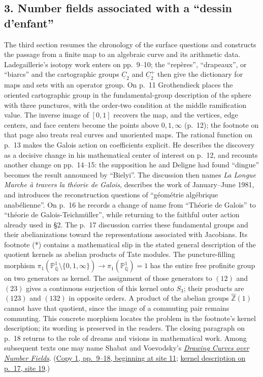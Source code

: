\subsection*{3. Number fields associated with a ``dessin d'enfant''}
The third section resumes the chronology of the surface questions and
constructs the passage from a finite map to an algebraic curve and its
arithmetic data. Ladegaillerie's isotopy work enters on pp.~9--10; the
``repères'', ``drapeaux'', or ``biarcs'' and the cartographic groups
$\underline C_2$ and $\underline C_2^+$ then give the dictionary for maps
and sets with an operator group. On p.~11 Grothendieck places the oriented
cartographic group in the fundamental-group description of the sphere
with three punctures, with the order-two condition at the middle
ramification value. The inverse image of $[0,1]$ recovers the map, and
the vertices, edge centers, and face centers become the points above
$0,1,\infty$ (p.~12); the footnote on that page also treats real curves
and unoriented maps. The rational function on p.~13 makes the Galois
action on coefficients explicit. He describes the discovery as a decisive
change in his mathematical center of interest on p.~12, and recounts
another change on pp.~14--15: the supposition he and Deligne had found
``dingue'' becomes the result announced by ``Bielyi''. The discussion then
names \emph{La Longue Marche à travers la théorie de Galois}, describes
the work of January--June 1981, and introduces the reconstruction questions
of ``géométrie algébrique anabélienne''. On p.~16 he records a change of
name from ``Théorie de Galois'' to ``théorie de Galois-Teichmüller'', while
returning to the faithful outer action already used in \S2. The p.~17
discussion carries these fundamental groups and their abelianizations
toward the representations associated with Jacobians. Its footnote (*)
contains a mathematical slip in the stated general description of the
quotient kernels as abelian products of Tate modules. The puncture-filling
morphism
$\pi_1(\mathbb P^1_{\overline{\mathbb Q}}\setminus\{0,1,\infty\})
\longrightarrow\pi_1(\mathbb P^1_{\overline{\mathbb Q}})=1$
has the entire free profinite group on two generators as kernel. The
assignment of those generators to $(12)$ and $(23)$ gives a continuous
surjection of this kernel onto $S_3$; their products are $(123)$ and
$(132)$ in opposite orders. A product of the abelian groups
$\hat{\mathbb Z}(1)$ cannot have that quotient, since the image of a
commuting pair remains commuting. This concrete morphism locates the
problem in the footnote's kernel description; its wording is preserved
in the readers. The closing paragraph on p.~18 returns to the role of
dreams and visions in mathematical work. Among subsequent texts one may
name Shabat and Voevodsky's
\href{https://www.math.ias.edu/vladimir/node/79}{\emph{Drawing Curves over Number Fields}}.
(\href{https://grothendieck.umontpellier.fr/web/viewer.html?file=../119.pdf\#page=12}{Copy 1, pp.~9--18, beginning at site 11};
\href{https://grothendieck.umontpellier.fr/web/viewer.html?file=../119.pdf\#page=20}{kernel description on p.~17, site 19}.)


